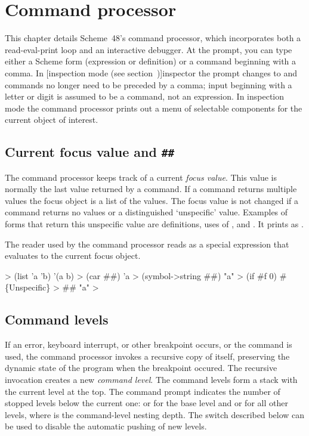 \chapter{Command processor}
\label{chapter:command-processor}

This chapter details Scheme~48's command processor, which incorporates
 both a read-eval-print loop and an interactive debugger.
At the \code{>} prompt, you can type either a Scheme form
 (expression or definition) or a command beginning with a comma.
In
[inspection mode (see section~\Ref)]{inspector}
 the prompt changes to \code{:} and commands
 no longer need to be preceded by a comma; input beginning with
 a letter or digit is assumed to be a command, not an expression.
In inspection mode the command processor prints out a
 menu of selectable components for the current object of interest.

\section{Current focus value and {\tt \#\#}}

The command processor keeps track of a current {\em focus value}.
This value is normally the last value returned by a command.
If a command returns multiple values the focus object is a list of the
 values.
The focus value is not changed if a command returns no values or 
 a distinguished `unspecific' value.
Examples of forms that return this unspecific value are definitions,
 uses of , and .
It prints as .

The reader used by the command processor reads \code{\#\#} as a special
 expression that evaluates to the current focus object.
\begin{example}
> (list 'a 'b)
'(a b)
> (car ##)
'a
> (symbol->string ##)
"a"
> (if #f 0)
#\{Unspecific\}
> ##
"a"
> 
\end{example}

\section{Command levels}

If an error, keyboard interrupt, or other breakpoint occurs, or the
  command is used, the command
 processor invokes a recursive copy of itself, preserving the dynamic state of
 the program when the breakpoint occured.
The recursive invocation creates a new {\em command level}.
The command levels form a stack with the current level at the top.
The command prompt indicates the number of stopped levels below the
 current one: \code{>} or \code{:} for the
 base level and  or  for all other levels,
 where  is the command-level nesting depth.
The  switch
 described below can be used to disable the automatic pushing of new levels.

